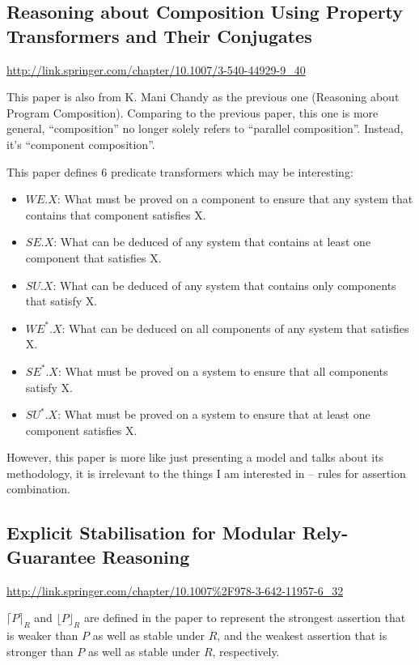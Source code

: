 \documentclass[fleqn]{article}
\begin{document}
\subsection{Reasoning about Composition Using Property Transformers and Their Conjugates}

\url{http://link.springer.com/chapter/10.1007/3-540-44929-9_40}

\bigskip

This paper is also from K. Mani Chandy as the previous one (Reasoning
about Program Composition). Comparing to the previous paper, this one
is more general, ``composition'' no longer solely refers to ``parallel
composition''. Instead, it's ``component composition''.

This paper defines 6 predicate transformers which may be interesting:

\begin{itemize}
\item $WE.X$: What must be proved on a component to ensure that any
  system that contains that component satisfies X.
\item $SE.X$: What can be deduced of any system that contains at least
  one component that satisfies X.
\item $SU.X$: What can be deduced of any system that contains only
  components that satisfy X.
\item $WE^*.X$: What can be deduced on all components of any system
  that satisfies X.
\item $SE^*.X$: What must be proved on a system to ensure that all
  components satisfy X.
\item $SU^*.X$: What must be proved on a system to ensure that at
  least one component satisfies X.
\end{itemize}

However, this paper is more like just presenting a model and talks
about its methodology, it is irrelevant to the things I am interested
in -- rules for assertion combination.


\subsection{Explicit Stabilisation for Modular Rely-Guarantee Reasoning}

\url{http://link.springer.com/chapter/10.1007%2F978-3-642-11957-6_32}

\bigskip

$\lceil P \rceil_R$ and $\lfloor P \rfloor_R$ are defined in the paper
to represent the strongest assertion that is weaker than $P$ as well
as stable under $R$, and the weakest assertion that is stronger than
$P$ as well as stable under $R$, respectively.
\end{document}
